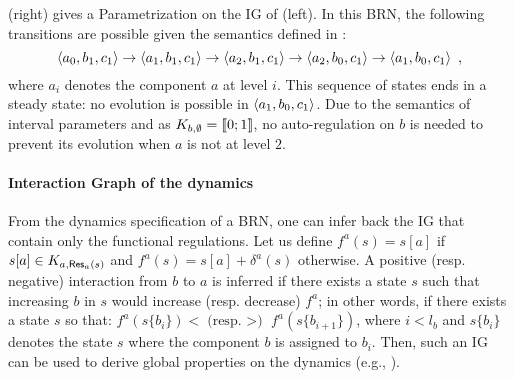 \begin{example}
(right) gives a Parametrization on the IG of (left).
In this BRN, the following transitions are possible given the semantics defined in :
$$\mbox{$\langle a_0, b_1, c_1 \rangle$} \rightarrow \mbox{$\langle a_1, b_1, c_1 \rangle$} \rightarrow \mbox{$\langle a_2, b_1, c_1 \rangle$} \rightarrow
\mbox{$\langle a_2, b_0, c_1 \rangle$} \rightarrow \mbox{$\langle a_1, b_0, c_1 \rangle$} \enspace,$$
where $a_i$ denotes the component $a$ at level $i$.
This sequence of states ends in a steady state: no evolution is possible in $\mbox{$\langle a_1, b_0, c_1 \rangle$}$.
Due to the semantics of interval parameters and as $K_{b,\emptyset} = \llbracket 0 ; 1 \rrbracket$, no auto-regulation on $b$ is needed to prevent its evolution when $a$ is not at level $2$.
\end{example}



\paragraph{Interaction Graph of the dynamics}
From the dynamics specification of a BRN, one can infer back the IG that contain only the functional
regulations.
Let us define
$f^a(s) = s[a]$ if $s[a]\in K_{a, \mathsf{Res}_{a}(s)}$
and
$f^a(s) = s[a]+\delta^a(s)$ otherwise.
A positive (resp. negative) interaction from $b$ to $a$ is inferred if there exists a state $s$ such
that increasing $b$ in $s$ would increase (resp. decrease) $f^a$; in other words, if
there exists a state $s$ so that:
$f^a(s\{b_i\}) < \text{(resp. $>$) } f^a(s\{b_{i+1}\})$, 
where $i < l_b$ and $s\{b_i\}$ denotes the state $s$ where the component $b$ is assigned to $b_i$.
Then, such an IG can be used to derive global properties on the dynamics
(e.g., \cite{Richard2010378,PR11-SASB}).

